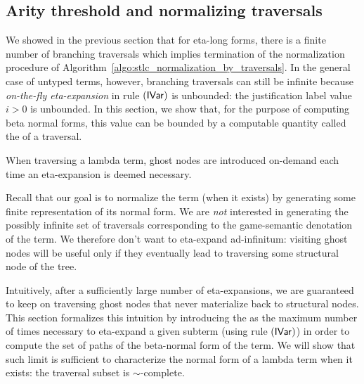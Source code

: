 \documentclass{article}
\theoremstyle{plain}
\theoremstyle{definition}
\theoremstyle{remark}
\begin{document}
\subsection{Arity threshold and normalizing traversals}

We showed in the previous section that for eta-long forms, there is a finite number of branching traversals which implies termination of the normalization procedure of Algorithm~\ref{algo:stlc_normalization_by_traversals}. In the general case of untyped terms, however, branching traversals can still be infinite because \emph{on-the-fly eta-expansion} in rule $\mathbf{({\sf IVar})}$ is unbounded: the justification label value $i>0$ is unbounded. In this section, we show that, for the purpose of computing beta normal forms, this value can be bounded by a computable quantity called the  of a traversal.

When traversing a lambda term, ghost nodes are introduced on-demand each time an eta-expansion is deemed necessary.

Recall that our goal is to normalize the term (when it exists) by generating some finite representation of its normal form. We are \emph{not} interested in generating the possibly infinite set of traversals corresponding to the game-semantic denotation of the term. We therefore don't want to eta-expand ad-infinitum: visiting ghost nodes will be useful only if they eventually lead to traversing some structural node of the tree.

Intuitively, after a sufficiently large number of eta-expansions, we are guaranteed to keep on traversing ghost nodes that never materialize back to structural nodes. This section formalizes this intuition by introducing the  as the maximum number of times necessary to eta-expand a given subterm (using rule $\mathbf{({\sf IVar})}$) in order to compute the set of paths of the beta-normal form of the term. We will show that such limit is sufficient to characterize the normal form of a lambda term when it exists: the traversal subset is $\sim$-complete.
\end{document}
